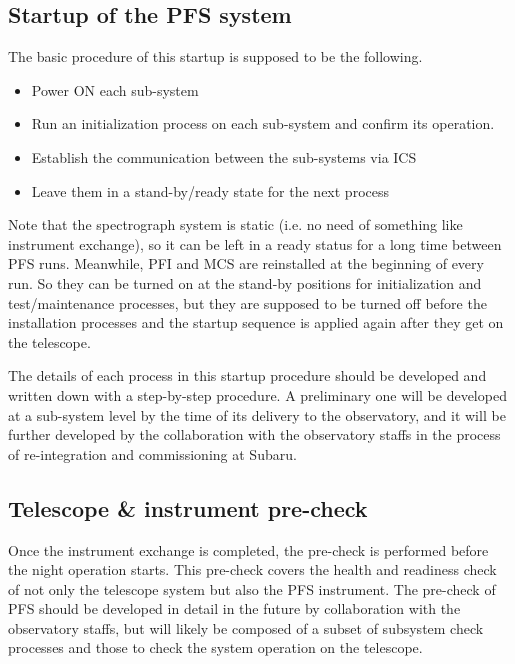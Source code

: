 \documentclass[a4paper]{article}
\begin{document}
\subsection{Startup of the PFS system}

The basic procedure of this startup is supposed to be the following.

\begin{itemize}
\item Power ON each sub-system
\item Run an initialization process on each sub-system and confirm its
  operation.
\item Establish the communication between the sub-systems via ICS
\item Leave them in a stand-by/ready state for the next process
\end{itemize}

Note that the spectrograph system is static (i.e. no need of something
like instrument exchange), so it can be left in a ready status for a
long time between PFS runs. Meanwhile, PFI and MCS are reinstalled at
the beginning of every run. So they can be turned on at the stand-by
positions for initialization and test/maintenance processes, but they
are supposed to be turned off before the installation processes and
the startup sequence is applied again after they get on the telescope.

The details of each process in this startup procedure should be
developed and written down with a step-by-step procedure. A
preliminary one will be developed at a sub-system level by the time of
its delivery to the observatory, and it will be further developed by
the collaboration with the observatory staffs in the process of
re-integration and commissioning at Subaru.

\subsection{Telescope \& instrument pre-check}
Once the instrument exchange is completed, the pre-check is performed
before the night operation starts. This pre-check covers the health
and readiness check of not only the telescope system but also the PFS
instrument. The pre-check of PFS should be developed in detail in the
future by collaboration with the observatory staffs, but will likely
be composed of a subset of subsystem check processes and those to
check the system operation on the telescope.
\end{document}
